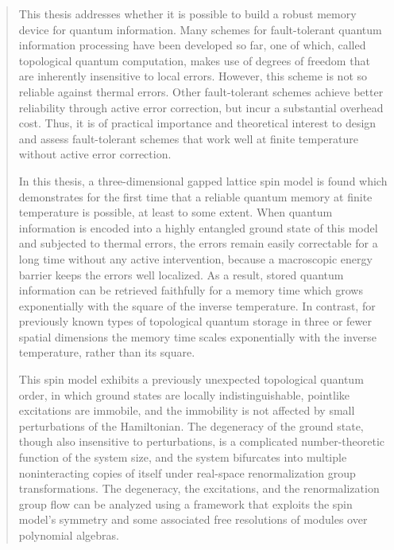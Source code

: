 \documentclass[letterpaper,10pt,defended]{cit_thesis}
\theoremstyle{definition} \newtheorem{defn}{Definition}[chapter]
\theoremstyle{definition} \newtheorem{rem}{Remark}[chapter]
\theoremstyle{definition} \newtheorem{example}{Example}[chapter]
\begin{document}
\begin{abstract}
This thesis addresses whether it is possible to build a robust memory device for quantum information. Many schemes for fault-tolerant quantum information processing have been developed so far, one of which, called topological quantum computation, makes use of degrees of freedom that are inherently insensitive to local errors. However, this scheme is not so reliable against thermal errors. Other fault-tolerant schemes achieve better reliability through active error correction, but incur a substantial overhead cost. Thus, it is of practical importance and theoretical interest to design and assess fault-tolerant schemes that work well at finite temperature without active error correction.


In this thesis, a three-dimensional gapped lattice spin model is found which demonstrates for the first time that a reliable quantum memory at finite temperature is possible, at least to some extent. When quantum information is encoded into a highly entangled ground state of this model and subjected to thermal errors, the errors remain easily correctable for a long time without any active intervention, because a macroscopic energy barrier keeps the errors well localized. As a result, stored quantum information can be retrieved faithfully for a memory time which grows exponentially with the square of the inverse temperature. In contrast, for previously known types of topological quantum storage in three or fewer spatial dimensions the memory time scales exponentially with the inverse temperature, rather than its square. 


This spin model exhibits a previously unexpected topological quantum order, in which ground states are locally indistinguishable, pointlike excitations are immobile, and the immobility is not affected by small perturbations of the Hamiltonian. The degeneracy of the ground state, though also insensitive to perturbations, is a complicated number-theoretic function of the system size, and the system bifurcates into multiple noninteracting copies of itself under real-space renormalization group transformations. The degeneracy, the excitations, and the renormalization group flow can be analyzed using a framework that exploits the spin model's symmetry and some associated free resolutions of modules over polynomial algebras.
\end{abstract}


\tableofcontents
\end{document}
